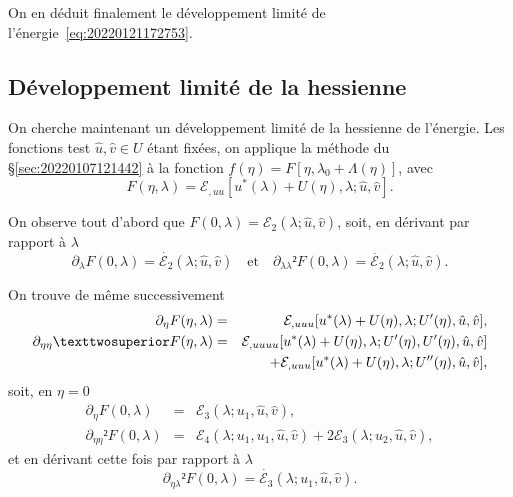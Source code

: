 \documentclass[12pt, final]{amsart}
\begin{document}
On en déduit finalement le développement limité de l'énergie~\eqref{eq:20220121172753}.

\subsection{Développement limité de la hessienne}
\label{sec:20211115081016}

On cherche maintenant un développement limité de la hessienne de l'énergie. Les
fonctions test \(\hat{u}, \hat{v}\in U\) étant fixées, on applique la méthode du
§\ref{sec:20220107121442} à la fonction \(f(\eta )=F[\eta , \lambda _0+\Lambda (\eta )]\), avec
\begin{equation}
  F(\eta , \lambda )=\mathcal E_{,uu}[u^*(\lambda )+U(\eta ), \lambda ; \hat{u}, \hat{v}].
\end{equation}

On observe tout d'abord que \(F(0, \lambda )=\mathcal E_2(\lambda ; \hat{u}, \hat{v})\), soit, en
dérivant par rapport à \(\lambda \)
\begin{equation}
  \partial _\lambda  F(0, \lambda )=\dot{\mathcal E_2}(\lambda ; \hat{u}, \hat{v})
  \quad\text{et}\quad
  \partial _{\lambda \lambda }²F(0, \lambda )=\ddot{\mathcal E_2}(\lambda ; \hat{u}, \hat{v}).
\end{equation}

On trouve de même successivement
\begin{eqnarray}
  \partial _\eta F(\eta , \lambda )&=&\mathcal E_{,uuu}[u^\ast(\lambda )+U(\eta ), \lambda ; U'(\eta ), \hat{u}, \hat{v}],\\
  \notag
  \partial _{\eta \eta }²F(\eta , \lambda )&=&\mathcal E_{,uuuu}[u^\ast(\lambda )+U(\eta ), \lambda ; U'(\eta ), U'(\eta ), \hat{u}, \hat{v}]\\
            &&+\mathcal E_{,uuu}[u^\ast(\lambda )+U(\eta ), \lambda ; U''(\eta ), \hat{u}, \hat{v}],
\end{eqnarray}
soit, en \(\eta =0\)
\begin{eqnarray}
  \partial _\eta F(0, \lambda )&=&\mathcal E_3(\lambda ; u_1, \hat{u}, \hat{v}),\\
  \partial _{\eta \eta }²F(0, \lambda )&=&\mathcal E_4(\lambda ; u_1, u_1, \hat{u}, \hat{v})+2\mathcal E_3(\lambda ; u_2, \hat{u}, \hat{v}),
\end{eqnarray}
et en dérivant cette fois par rapport à \(\lambda \)
\begin{equation}
  \partial _{\eta \lambda }²F(0, \lambda )=\dot{\mathcal E_3}(\lambda ; u_1, \hat{u}, \hat{v}).
\end{equation}
\end{document}
